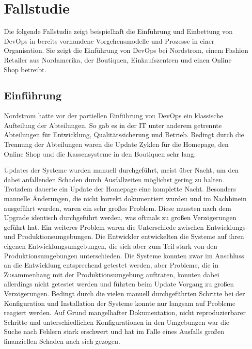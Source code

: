\section{Fallstudie} %
Die folgende Fallstudie zeigt beispielhaft die Einführung und Einbettung von DevOps in bereits vorhandene Vorgehensmodelle und Prozesse in einer Organisation. 
Sie zeigt die Einführung von DevOps bei Nordstrom, einem Fashion Retailer aus Nordamerika, der Boutiquen, Einkaufszentren und einen Online Shop betreibt.


\subsection{Einführung}
Nordstrom hatte vor der partiellen Einführung von DevOps ein klassische Aufteilung der Abteilungen. 
So gab es in der IT unter anderem getrennte Abteilungen für Entwicklung, Qualitätssicherung und Betrieb.
Bedingt durch die Trennung der Abteilungen waren die Update Zyklen für die Homepage, den Online Shop und die Kassensysteme in den Boutiquen sehr lang. 
\parencite[Vgl.][S. 1 ff.]{Reed:2014}

Updates der Systeme wurden manuell durchgeführt, meist über Nacht, um den dabei anfallenden Schaden durch Ausfallzeiten möglichst gering zu halten. 
Trotzdem dauerte ein Update der Homepage eine komplette Nacht. 
Besonders manuelle Änderungen, die nicht korrekt dokumentiert wurden und im Nachhinein ausgeführt wurden, waren ein sehr großes Problem. 
Diese mussten nach dem Upgrade identisch durchgeführt werden, was oftmals zu großen Verzögerungen geführt hat. 
Ein weiteres Problem waren die Unterschiede zwischen Entwicklungs- und Produktionsumgebungen. 
Die Entwickler entwickelten die Systeme auf ihren eigenen Entwicklungsumgebungen, die sich aber zum Teil stark von den Produktionsumgebungen unterschieden. 
Die Systeme konnten zwar im Anschluss an die Entwicklung entsprechend getestet werden, aber Probleme, die in Zusammenhang mit der Produktionsumgebung auftraten, konnten dabei allerdings nicht getestet werden und führten beim Update Vorgang zu großen Verzögerungen.
Bedingt durch die vielen manuell durchgeführten Schritte bei der Konfiguration und Installation der Systeme konnte nur langsam auf Probleme reagiert werden. 
Auf Grund mangelhafter Dokumentation, nicht reproduzierbarer Schritte und unterschiedlichen Konfigurationen in den Umgebungen war die Suche nach Fehlern stark erschwert und hat im Falle eines Ausfalls großen finanziellen Schaden nach sich gezogen. 
\parencite[Vgl.][S. 3 ff.]{Reed:2014}


